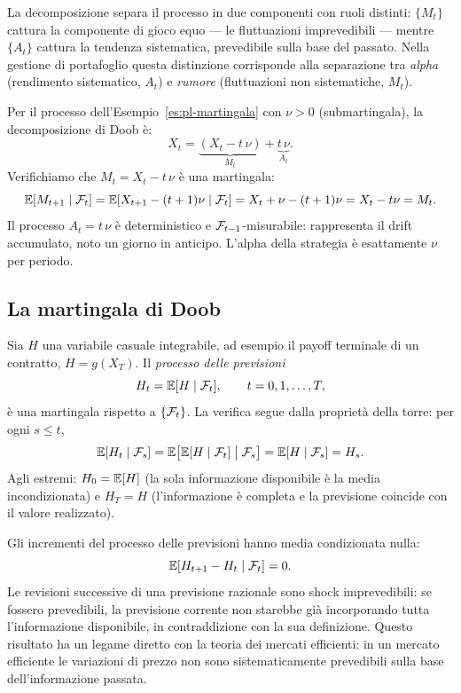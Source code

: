 La decomposizione separa il processo in due componenti con
ruoli distinti: $\{M_t\}$ cattura la componente di gioco equo
--- le fluttuazioni imprevedibili --- mentre $\{A_t\}$ cattura
la tendenza sistematica, prevedibile sulla base del passato.
Nella gestione di portafoglio questa distinzione corrisponde
alla separazione tra \emph{alpha} (rendimento sistematico,
$A_t$) e \emph{rumore} (fluttuazioni non sistematiche, $M_t$).

\begin{example}
\label{es:decomposizione-doob}
Per il processo dell'Esempio~\ref{es:pl-martingala} con
$\nu>0$ (submartingala), la decomposizione di Doob
\`{e}:
\[
X_t = \underbrace{(X_t-t\,\nu)}_{M_t} +
      \underbrace{t\,\nu}_{A_t}.
\]
Verifichiamo che $M_t=X_t-t\,\nu$ \`{e} una martingala:
\[
\mathbb{E}[M_{t+1}\mid\mathcal{F}_t]
=\mathbb{E}[X_{t+1}-(t+1)\nu\mid\mathcal{F}_t]
=X_t+\nu-(t+1)\nu
=X_t-t\nu=M_t.
\]
Il processo $A_t=t\,\nu$ \`{e} deterministico e
$\mathcal{F}_{t-1}$-misurabile: rappresenta il drift accumulato, noto
un giorno in anticipo. L'alpha della strategia \`{e}
esattamente $\nu$ per periodo.
\end{example}

\subsection{La martingala di Doob}

\begin{example}
\label{es:doob}
Sia $H$ una variabile casuale integrabile, ad esempio il
payoff terminale di un contratto, $H=g(X_T)$. Il
\emph{processo delle previsioni}
\[
H_t=\mathbb{E}[H\mid\mathcal{F}_t], \qquad t=0,1,\ldots,T,
\]
\`{e} una martingala rispetto a $\{\mathcal{F}_t\}$. La verifica
segue dalla propriet\`{a} della torre: per ogni $s\leq t$,
\[
\mathbb{E}[H_t\mid\mathcal{F}_s]
=\mathbb{E}\bigl[\mathbb{E}[H\mid\mathcal{F}_t]\bigm|\mathcal{F}_s\bigr]
=\mathbb{E}[H\mid\mathcal{F}_s]=H_s.
\]
Agli estremi: $H_0=\mathbb{E}[H]$ (la sola informazione disponibile
\`{e} la media incondizionata) e $H_T=H$ (l'informazione
\`{e} completa e la previsione coincide con il valore
realizzato).

Gli incrementi del processo delle previsioni hanno media
condizionata nulla:
\[
\mathbb{E}[H_{t+1}-H_t\mid\mathcal{F}_t]=0.
\]
Le revisioni successive di una previsione razionale sono
shock imprevedibili: se fossero prevedibili, la previsione
corrente non starebbe gi\`{a} incorporando tutta
l'informazione disponibile, in contraddizione con la sua
definizione. Questo risultato ha un legame diretto con la
teoria dei mercati efficienti: in un mercato efficiente le
variazioni di prezzo non sono sistematicamente prevedibili
sulla base dell'informazione passata.
\end{example}

